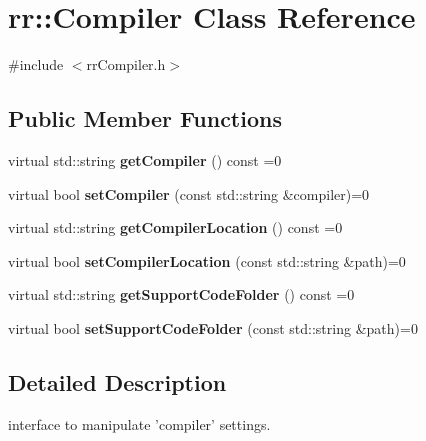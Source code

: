 \hypertarget{classrr_1_1_compiler}{\section{rr\-:\-:Compiler Class Reference}
\label{classrr_1_1_compiler}
}


{\ttfamily \#include $<$rr\-Compiler.\-h$>$}

\subsection*{Public Member Functions}
\begin{DoxyCompactItemize}
\item 
\hypertarget{classrr_1_1_compiler_a30d924b503ddddc0056108f6f08e86ee}{virtual std\-::string {\bfseries get\-Compiler} () const =0}\label{classrr_1_1_compiler_a30d924b503ddddc0056108f6f08e86ee}

\item 
\hypertarget{classrr_1_1_compiler_a0556fb1db12b7f693d37a6108068103d}{virtual bool {\bfseries set\-Compiler} (const std\-::string \&compiler)=0}\label{classrr_1_1_compiler_a0556fb1db12b7f693d37a6108068103d}

\item 
\hypertarget{classrr_1_1_compiler_a2d39ffe37cd77cbbc802085197e7b3de}{virtual std\-::string {\bfseries get\-Compiler\-Location} () const =0}\label{classrr_1_1_compiler_a2d39ffe37cd77cbbc802085197e7b3de}

\item 
\hypertarget{classrr_1_1_compiler_a08a268ed8d239e64f7dca5ffe883e606}{virtual bool {\bfseries set\-Compiler\-Location} (const std\-::string \&path)=0}\label{classrr_1_1_compiler_a08a268ed8d239e64f7dca5ffe883e606}

\item 
\hypertarget{classrr_1_1_compiler_ac9bcede80a7f19a2294e812f0f9f2208}{virtual std\-::string {\bfseries get\-Support\-Code\-Folder} () const =0}\label{classrr_1_1_compiler_ac9bcede80a7f19a2294e812f0f9f2208}

\item 
\hypertarget{classrr_1_1_compiler_a79c97dd74e6eea11b64c7469c55a6d89}{virtual bool {\bfseries set\-Support\-Code\-Folder} (const std\-::string \&path)=0}\label{classrr_1_1_compiler_a79c97dd74e6eea11b64c7469c55a6d89}

\end{DoxyCompactItemize}


\subsection{Detailed Description}
interface to manipulate 'compiler' settings.

